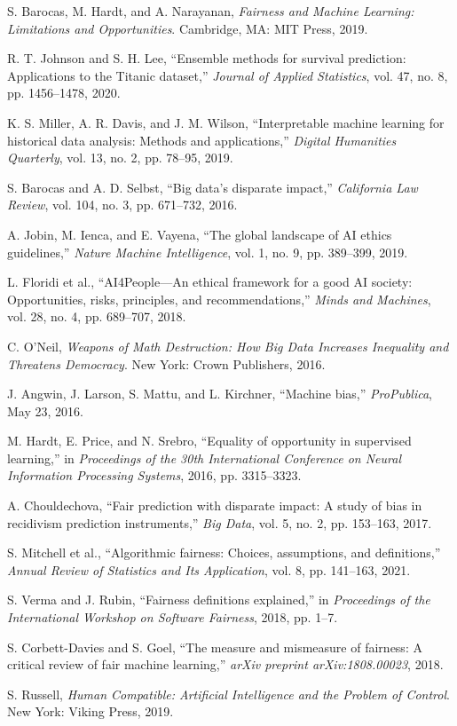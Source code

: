 \documentclass[conference]{IEEEtran}
\begin{document}
\begin{thebibliography}{00}
 S. Barocas, M. Hardt, and A. Narayanan, \textit{Fairness and Machine Learning: Limitations and Opportunities}. Cambridge, MA: MIT Press, 2019.

 R. T. Johnson and S. H. Lee, ``Ensemble methods for survival prediction: Applications to the Titanic dataset,'' \textit{Journal of Applied Statistics}, vol. 47, no. 8, pp. 1456--1478, 2020.

 K. S. Miller, A. R. Davis, and J. M. Wilson, ``Interpretable machine learning for historical data analysis: Methods and applications,'' \textit{Digital Humanities Quarterly}, vol. 13, no. 2, pp. 78--95, 2019.

 S. Barocas and A. D. Selbst, ``Big data's disparate impact,'' \textit{California Law Review}, vol. 104, no. 3, pp. 671--732, 2016.

 A. Jobin, M. Ienca, and E. Vayena, ``The global landscape of AI ethics guidelines,'' \textit{Nature Machine Intelligence}, vol. 1, no. 9, pp. 389--399, 2019. 

 L. Floridi et al., ``AI4People—An ethical framework for a good AI society: Opportunities, risks, principles, and recommendations,'' \textit{Minds and Machines}, vol. 28, no. 4, pp. 689--707, 2018.

 C. O'Neil, \textit{Weapons of Math Destruction: How Big Data Increases Inequality and Threatens Democracy}. New York: Crown Publishers, 2016.

 J. Angwin, J. Larson, S. Mattu, and L. Kirchner, ``Machine bias,'' \textit{ProPublica}, May 23, 2016.

 M. Hardt, E. Price, and N. Srebro, ``Equality of opportunity in supervised learning,'' in \textit{Proceedings of the 30th International Conference on Neural Information Processing Systems}, 2016, pp. 3315--3323.

 A. Chouldechova, ``Fair prediction with disparate impact: A study of bias in recidivism prediction instruments,'' \textit{Big Data}, vol. 5, no. 2, pp. 153--163, 2017.

 S. Mitchell et al., ``Algorithmic fairness: Choices, assumptions, and definitions,'' \textit{Annual Review of Statistics and Its Application}, vol. 8, pp. 141--163, 2021.

 S. Verma and J. Rubin, ``Fairness definitions explained,'' in \textit{Proceedings of the International Workshop on Software Fairness}, 2018, pp. 1--7.

 S. Corbett-Davies and S. Goel, ``The measure and mismeasure of fairness: A critical review of fair machine learning,'' \textit{arXiv preprint arXiv:1808.00023}, 2018.

 S. Russell, \textit{Human Compatible: Artificial Intelligence and the Problem of Control}. New York: Viking Press, 2019.

\end{thebibliography}
\end{document}
